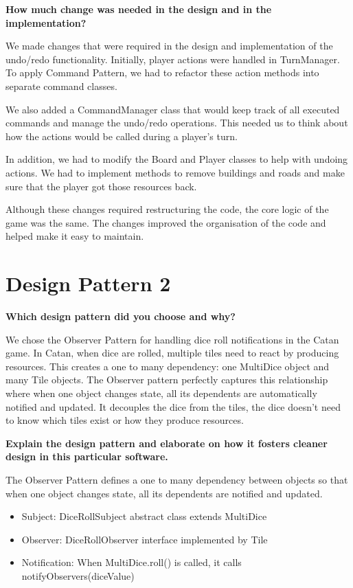 \textbf{How much change was needed in the design and in the implementation?}

We made changes that were required in the design and implementation of the undo/redo functionality. Initially, player actions were handled in TurnManager. To apply Command Pattern, we had to refactor these action methods into separate command classes. 

We also added a CommandManager class that would keep track of all executed commands and manage the undo/redo operations. This needed us to think about how the actions would be called during a player’s turn.

In addition, we had to modify the Board and Player classes to help with undoing actions. We had to implement methods to remove buildings and roads and make sure that the player got those resources back.

Although these changes required restructuring the code, the core logic of the game was the same. The changes improved the organisation of the code and helped make it easy to maintain.
\\

\section{Design Pattern 2}

\textbf{Which design pattern did you choose and why?}

We chose the Observer Pattern for handling dice roll notifications in the Catan game. 
In Catan, when dice are rolled, multiple tiles need to react by producing resources.
This creates a one to many dependency: one MultiDice object and many Tile objects.
The Observer pattern perfectly captures this relationship where when one object changes state, all its dependents are automatically notified and updated.
It decouples the dice from the tiles, the dice doesn't need to know which tiles exist or how they produce resources. 

\textbf{Explain the design pattern and elaborate on how it fosters cleaner design in this
particular software.}

The Observer Pattern defines a one to many dependency between objects so that when one object changes state, all its dependents are notified and updated.

\begin{itemize}
    \item Subject: DiceRollSubject abstract class extends MultiDice
    \item Observer: DiceRollObserver interface implemented by Tile
    \item Notification: When MultiDice.roll() is called, it calls notifyObservers(diceValue)
\end{itemize}

